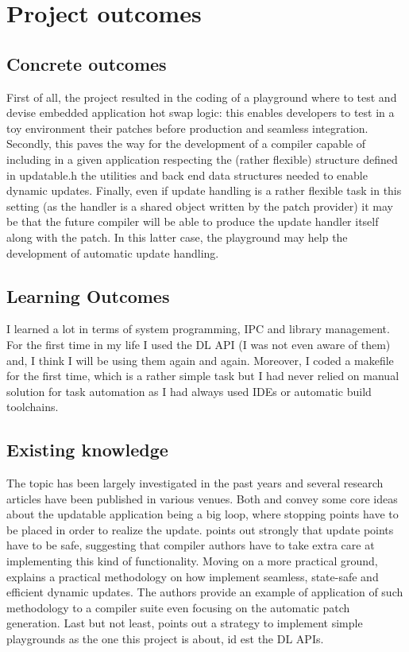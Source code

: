 \documentclass[10pt,a4]{article}
\begin{document}
\section{Project outcomes}
\subsection{Concrete outcomes}
First of all, the project resulted in the coding of a playground where to test and devise embedded application hot swap logic: this enables developers to test in a toy environment their patches before production and seamless integration. Secondly, this paves the way for the development of a compiler capable of including in a given application respecting the (rather flexible) structure defined in updatable.h  the utilities and back end data structures needed to enable dynamic updates. Finally, even if update handling is a rather flexible task in this setting (as the handler is a shared object written by the patch provider) it may be that the future compiler will be able to produce the update handler itself along with the patch. In this latter case, the playground may help the development of automatic update handling. 

\subsection{Learning Outcomes}
 I learned a lot in terms of system programming, IPC and library management. For the first time in my life I used the DL API (I was not even aware of them) and, I think I will be using them again and again. 
 Moreover, I coded a makefile for the first time, which is a rather simple task but I had never relied on manual solution for task automation as I had always used IDEs or automatic build toolchains. 

\subsection{Existing knowledge}
The topic has been largely investigated in the past years and several research articles have been published in various venues. Both \cite{FDSU} and \cite{DSU} convey some core ideas about the updatable application being a big loop, where stopping points have to be placed in order to realize the update. \cite{FDSU} points out strongly that update points have to be safe, suggesting that compiler authors have to take extra care at implementing this kind of functionality. Moving on a more practical ground, \cite{PDSU} explains a practical methodology on how implement seamless, state-safe and efficient dynamic updates. The authors provide an example of application of such methodology to a compiler suite even focusing on the automatic patch generation.  
Last but not least, \cite{PDSU} points out a strategy to implement simple playgrounds as the one this project is about, id est the DL APIs. 
\end{document}
